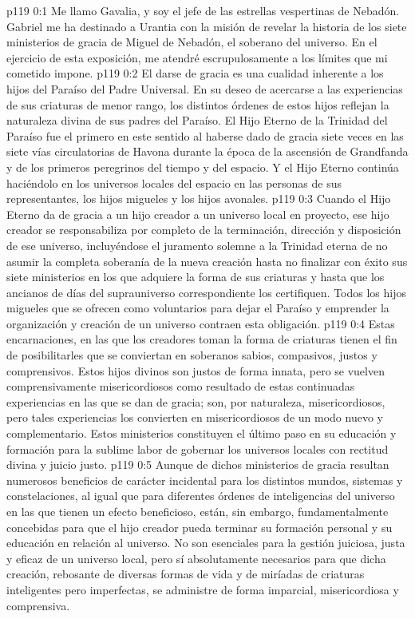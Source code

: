 \author{Jefe de las estrellas vespertinas}
\vs p119 0:1 Me llamo Gavalia, y soy el jefe de las estrellas vespertinas de Nebadón. Gabriel me ha destinado a Urantia con la misión de revelar la historia de los siete ministerios de gracia de Miguel de Nebadón, el soberano del universo. En el ejercicio de esta exposición, me atendré escrupulosamente a los límites que mi cometido impone.
\vs p119 0:2 \pc El darse de gracia es una cualidad inherente a los hijos del Paraíso del Padre Universal. En su deseo de acercarse a las experiencias de sus criaturas de menor rango, los distintos órdenes de estos hijos reflejan la naturaleza divina de sus padres del Paraíso. El Hijo Eterno de la Trinidad del Paraíso fue el primero en este sentido al haberse dado de gracia siete veces en las siete vías circulatorias de Havona durante la época de la ascensión de Grandfanda y de los primeros peregrinos del tiempo y del espacio. Y el Hijo Eterno continúa haciéndolo en los universos locales del espacio en las personas de sus representantes, los hijos migueles y los hijos avonales.
\vs p119 0:3 Cuando el Hijo Eterno da de gracia a un hijo creador a un universo local en proyecto, ese hijo creador se responsabiliza por completo de la terminación, dirección y disposición de ese universo, incluyéndose el juramento solemne a la Trinidad eterna de no asumir la completa soberanía de la nueva creación hasta no finalizar con éxito sus siete ministerios en los que adquiere la forma de sus criaturas y hasta que los ancianos de días del suprauniverso correspondiente los certifiquen. Todos los hijos migueles que se ofrecen como voluntarios para dejar el Paraíso y emprender la organización y creación de un universo contraen esta obligación.
\vs p119 0:4 Estas encarnaciones, en las que los creadores toman la forma de criaturas tienen el fin de posibilitarles que se conviertan en soberanos sabios, compasivos, justos y comprensivos. Estos hijos divinos son justos de forma innata, pero se vuelven comprensivamente misericordiosos como resultado de estas continuadas experiencias en las que se dan de gracia; son, por naturaleza, misericordiosos, pero tales experiencias los convierten en misericordiosos de un modo nuevo y complementario. Estos ministerios constituyen el último paso en su educación y formación para la sublime labor de gobernar los universos locales con rectitud divina y juicio justo.
\vs p119 0:5 Aunque de dichos ministerios de gracia resultan numerosos beneficios de carácter incidental para los distintos mundos, sistemas y constelaciones, al igual que para diferentes órdenes de inteligencias del universo en las que tienen un efecto beneficioso, están, sin embargo, fundamentalmente concebidas para que el hijo creador pueda terminar su formación personal y su educación en relación al universo. No son esenciales para la gestión juiciosa, justa y eficaz de un universo local, pero sí absolutamente necesarios para que dicha creación, rebosante de diversas formas de vida y de miríadas de criaturas inteligentes pero imperfectas, se administre de forma imparcial, misericordiosa y comprensiva.
